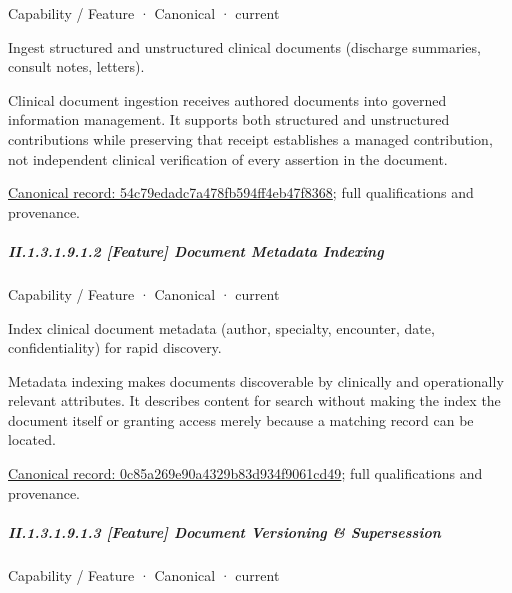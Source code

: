 \label{element:54c79edadc7a478fb594ff4eb47f8368}
{\small Capability / Feature · Canonical · current}\par

Ingest structured and unstructured clinical documents (discharge summaries, consult notes, letters).



Clinical document ingestion receives authored documents into governed information management. It supports both structured and unstructured contributions while preserving that receipt establishes a managed contribution, not independent clinical verification of every assertion in the document.


{\footnotesize \href{../../../../continuum/strategy/capability/feature/54c79edadc7a478fb594ff4eb47f8368.md}{Canonical record: 54c79edadc7a478fb594ff4eb47f8368}; full qualifications and provenance.}\par
\subparagraph*{II.1.3.1.9.1.2 [Feature] Document Metadata Indexing}
\label{navigation:II.1.3.1.9.1.2}

\label{element:0c85a269e90a4329b83d934f9061cd49}
{\small Capability / Feature · Canonical · current}\par

Index clinical document metadata (author, specialty, encounter, date, confidentiality) for rapid discovery.



Metadata indexing makes documents discoverable by clinically and operationally relevant attributes. It describes content for search without making the index the document itself or granting access merely because a matching record can be located.


{\footnotesize \href{../../../../continuum/strategy/capability/feature/0c85a269e90a4329b83d934f9061cd49.md}{Canonical record: 0c85a269e90a4329b83d934f9061cd49}; full qualifications and provenance.}\par
\subparagraph*{II.1.3.1.9.1.3 [Feature] Document Versioning \& Supersession}
\label{navigation:II.1.3.1.9.1.3}

\label{element:c8e2e623dd4e4c3b8de6c3bfb8c2a3ee}
{\small Capability / Feature · Canonical · current}\par

